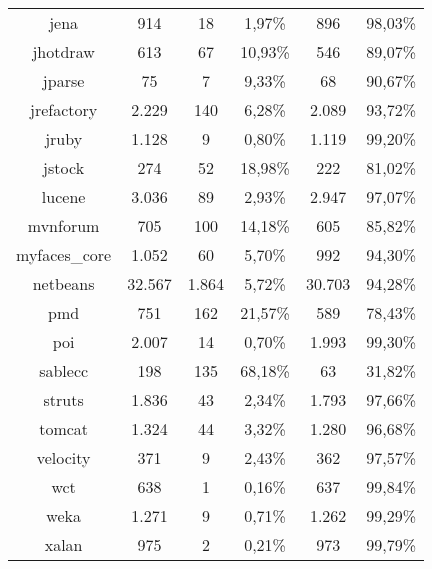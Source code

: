 \begin{table}
\begin{tabularx}{\textwidth}{c|c|c|c|c|c}
		jena & 914 & 18 & 1,97\% & 896 & 98,03\% \\
		jhotdraw & 613 & 67 & 10,93\% & 546 & 89,07\% \\
		jparse & 75 & 7 & 9,33\% & 68 & 90,67\% \\
		jrefactory & 2.229 & 140 & 6,28\% & 2.089 & 93,72\% \\
		jruby & 1.128 & 9 & 0,80\% & 1.119 & 99,20\% \\
		jstock & 274 & 52 & 18,98\% & 222 & 81,02\% \\
		lucene & 3.036 & 89 & 2,93\% & 2.947 & 97,07\% \\
		mvnforum & 705 & 100 & 14,18\% & 605 & 85,82\% \\
		myfaces\_core & 1.052 & 60 & 5,70\% & 992 & 94,30\% \\
		netbeans & 32.567 & 1.864 & 5,72\% & 30.703 & 94,28\% \\
		pmd & 751 & 162 & 21,57\% & 589 & 78,43\% \\
		poi & 2.007 & 14 & 0,70\% & 1.993 & 99,30\% \\
		sablecc & 198 & 135 & 68,18\% & 63 & 31,82\% \\
		struts & 1.836 & 43 & 2,34\% & 1.793 & 97,66\% \\
		tomcat & 1.324 & 44 & 3,32\% & 1.280 & 96,68\% \\
		velocity & 371 & 9 & 2,43\% & 362 & 97,57\% \\
		wct & 638 & 1 & 0,16\% & 637 & 99,84\% \\
		weka & 1.271 & 9 & 0,71\% & 1.262 & 99,29\% \\
		xalan & 975 & 2 & 0,21\% & 973 & 99,79\% \\
	\end{tabularx}
\end{table}
\setlength{\extrarowheight}{0em}